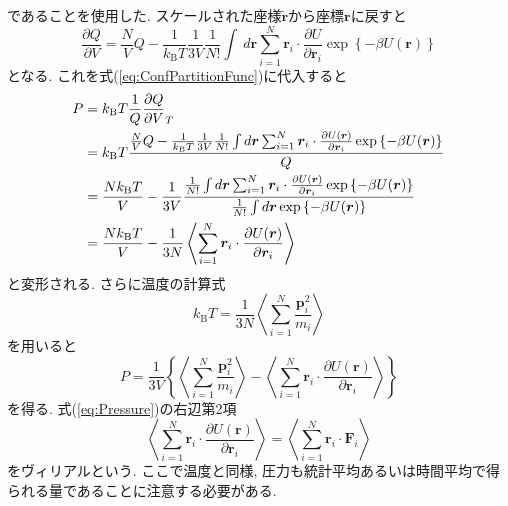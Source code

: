 であることを使用した.
スケールされた座様$\tilde{\bm{r}}$から座標$\bm{r}$に戻すと
\begin{equation}
  \frac{\partial Q}{\partial V}
 =\frac{N}{V}Q
 -\frac{1}{k_{\mathrm{B}} T} \frac{1}{3V} \frac{1}{N!}
  \int ~d\bm{r}
  \sum_{i=1}^{N} \bm{r}_{i} \cdot \frac{\partial U}{\partial \bm{r}_{i}}
  \exp \left\{ -\beta U(\bm{r})\right\}
\end{equation}
となる.
これを式(\ref{eq:ConfPartitionFunc})に代入すると
\begin{align}
  P
&=k_{\mathrm{B}} T \frac{1}{Q} \frac{\partial Q}{\partial V}_{T}
  \notag
  \\
&=k_{\mathrm{B}} T
  \frac{
         \frac{N}{V}Q
        -\frac{1}{k_{\mathrm{B}} T} \frac{1}{3V} \frac{1}{N!}
         \int d\bm{r}
         \sum_{i=1}^{N} \bm{r}_{i} \cdot \frac{\partial U(\bm{r})}{\partial \bm{r}_{i}}
         \exp \left\{ -\beta U(\bm{r})\right\}
       }{Q}
  \notag
  \\
&=\frac{N k_{\mathrm{B}} T}{V}
 -\frac{1}{3V}
  \frac{
         \frac{1}{N!}
         \int d\bm{r}
         \sum_{i=1}^{N} \bm{r}_{i} \cdot \frac{\partial U(\bm{r})}{\partial \bm{r}_{i}}
         \exp \left\{ -\beta U(\bm{r})\right\}
       }
       {
         \frac{1}{N!}
         \int d\bm{r}
         \exp \left\{ -\beta U(\bm{r})\right\}
       }
   \notag
   \\
 &=\frac{N k_{\mathrm{B}} T}{V}
  -\frac{1}{3N}
   \left\langle \sum_{i=1}^{N} \bm{r}_{i} \cdot \frac{\partial U(\bm{r})}{\partial \bm{r}_{i}} \right\rangle
\end{align}
と変形される.
さらに温度の計算式
\begin{equation}
 k_{\mathrm{B}} T
=\frac{1}{3N}
 \left\langle \sum_{i=1}^{N} \frac{\bm{p}_{i}^{2}}{m_{i}} \right\rangle
\end{equation}
を用いると
\begin{equation}
  P
=\frac{1}{3V}
 \left\{
         \left\langle \sum_{i=1}^{N} \frac{\bm{p}_{i}^{2}}{m_{i}} \right\rangle
        -\left\langle \sum_{i=1}^{N} \bm{r}_{i} \cdot \frac{\partial U(\bm{r})}{\partial \bm{r}_{i}} \right\rangle
 \right\}
 \label{eq:Pressure}
\end{equation}
を得る.
式(\ref{eq:Pressure})の右辺第2項
\begin{equation}
 \left\langle \sum_{i=1}^{N} \bm{r}_{i} \cdot \frac{\partial U(\bm{r})}{\partial \bm{r}_{i}} \right\rangle
=\left\langle \sum_{i=1}^{N} \bm{r}_{i} \cdot \bm{F}_{i} \right\rangle
\end{equation}
をヴィリアルという.
ここで温度と同様, 圧力も統計平均あるいは時間平均で得られる量であることに注意する必要がある.

